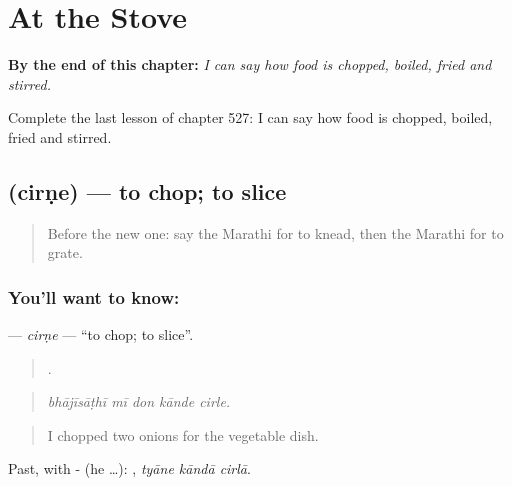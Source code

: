 
\chapter{At the Stove}
\label{ch:mr-at-the-stove}

\begin{chapteropening}
\textbf{By the end of this chapter:} \emph{I can say how food is chopped, boiled, fried and stirred.}

Complete the last lesson of chapter 527: I can say how food is chopped, boiled, fried and stirred.
\end{chapteropening}

\section[\texorpdfstring{\mr{चिरणे} (cirṇe)}{चिरणे (cirṇe)}]{ (cirṇe) — to chop; to slice}

\label{lesson:MR-C527-cirne}



\begin{quote}
Before the new one: say the Marathi for to knead, then the Marathi for to grate.
\end{quote}

\subsection*{You'll want to know: }
\textbf{} — \emph{cirṇe} — \textquotedblleft{}to chop; to slice\textquotedblright{}.

\begin{quote}
    .
\end{quote}

\begin{quote}
\emph{bhājīsāṭhī mī don kānde cirle.}
\end{quote}

\begin{quote}
I chopped two onions for the vegetable dish.
\end{quote}

Past, with - (he …):   , \emph{tyāne kāndā cirlā}.

